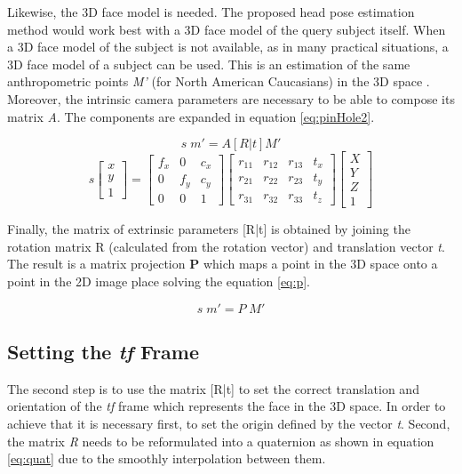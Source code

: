 \documentclass{sig-alternate}
\begin{document}
\newpage
Likewise, the 3D face model is needed. The proposed head pose estimation method would work best with a 3D face model of the query subject itself. When a 3D face model of the subject is not available, as in many practical situations, a 3D face model of a subject can be used. This is an estimation of the same anthropometric points \textit{M'} (for North American Caucasians) in the 3D space \cite{farkas1994anthropometry}. Moreover, the intrinsic camera parameters are necessary to be able to compose its matrix \textit{A}. The components are expanded in equation \ref{eq:pinHole2}.	

\begin{equation}
s  \; m' = A [R|t] M'
\label{eq:pinHole}
\end{equation}
\begin{equation}
s
\begin{bmatrix}
x \\
y \\
1
\end{bmatrix}
=
\begin{bmatrix}
f_x & 0 & c_x  \\
0 & f_y & c_y  \\
0 & 0 & 1 
\end{bmatrix}
\begin{bmatrix}
r_{11} & r_{12} & r_{13} & t_x  \\
r_{21} & r_{22} & r_{23} & t_y  \\
r_{31} & r_{32} & r_{33} & t_z  
\end{bmatrix}
\begin{bmatrix}
X \\
Y \\
Z \\
1
\end{bmatrix}
\label{eq:pinHole2}
\end{equation}

Finally, the matrix of extrinsic parameters [R|t] is obtained by joining the rotation matrix R (calculated from the rotation vector) and translation vector \textit{t}. The result is a matrix projection \textbf{P} which maps a point in the 3D space onto a point in the 2D image place solving the equation \ref{eq:p}.

\begin{equation}
s  \; m' = P \; M'
\label{eq:p}
\end{equation}

\subsection{Setting the \textit{tf} Frame}
The second step is to use the matrix [R|t] to set the correct translation and orientation of the \textit{tf} frame which represents the face in the 3D space. In order to achieve that it is necessary first, to set the origin defined by the vector \textit{t}. Second, the matrix \textit{R} needs to be reformulated into a quaternion as shown in equation \ref{eq:quat} due to the smoothly interpolation between them.
\end{document}
